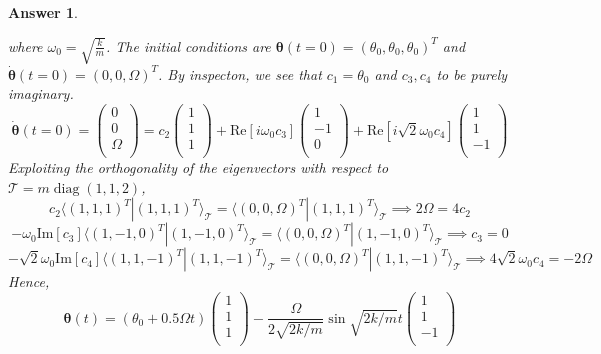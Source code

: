 \documentclass[a4paper]{article}
\DeclareMathOperator{\diag}{diag}
\newtheorem{ans}{Answer}[section]
\theoremstyle{new}
\begin{document}
\begin{ans}
\begin{enumerate}[label=(\alph*)]
where $\omega_0=\sqrt{\frac{k}{m}}$. The initial conditions are $\boldsymbol{\theta}(t=0)=(\theta_0,\theta_0,\theta_0)^T$ and $\boldsymbol{\dot{\theta}}(t=0)=(0,0,\Omega)^T$. By inspecton, we see that $c_1=\theta_0$ and $c_3,c_4$ to be purely imaginary.
$$\boldsymbol{\dot{\theta}}(t=0)=\begin{pmatrix}0\\0\\\Omega\\\end{pmatrix}=c_2\begin{pmatrix}1\\1\\1\\\end{pmatrix}+\text{Re}[i\omega_0c_3]\begin{pmatrix}1\\-1\\0\\\end{pmatrix}+\text{Re}[i\sqrt{2}\omega_0c_4]\begin{pmatrix}1\\1\\-1\\\end{pmatrix}$$
Exploiting the orthogonality of the eigenvectors with respect to $\mathcal{T}=m\diag(1,1,2)$,
$$c_2\langle(1,1,1)^T|(1,1,1)^T\rangle_{\mathcal{T}}=\langle(0,0,\Omega)^T|(1,1,1)^T\rangle_{\mathcal{T}}\implies 2\Omega=4c_2$$
$$-\omega_0\text{Im}[c_3]\langle(1,-1,0)^T|(1,-1,0)^T\rangle_{\mathcal{T}}=\langle(0,0,\Omega)^T|(1,-1,0)^T\rangle_{\mathcal{T}}\implies c_3=0$$
$$-\sqrt{2}\omega_0\text{Im}[c_4]\langle(1,1,-1)^T|(1,1,-1)^T\rangle_{\mathcal{T}}=\langle(0,0,\Omega)^T|(1,1,-1)^T\rangle_{\mathcal{T}}\implies 4\sqrt{2}\omega_0c_4=-2\Omega$$
Hence,
$$\boldsymbol{\theta}(t)=(\theta_0+0.5\Omega t)\begin{pmatrix}1\\1\\1\\\end{pmatrix}-\frac{\Omega}{2\sqrt{2k/m}}\sin\sqrt{2k/m}t\begin{pmatrix}1\\1\\-1\\\end{pmatrix}$$
\end{enumerate}
\end{ans}
\newpage
\end{document}
